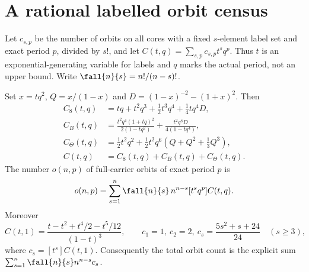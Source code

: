 \section{A rational labelled orbit census}
Let $c_{s,p}$ be the number of orbits on all cores with a fixed $s$-element
label set and exact period $p$, divided by $s!$, and let
$C(t,q)=\sum_{s,p}c_{s,p}t^sq^p$. Thus $t$ is an exponential-generating
variable for labels and $q$ marks the actual period, not an upper bound.
Write $\fall{n}{s}=n!/(n-s)!$.

\begin{theorem}\label{thm:census}
Set $x=tq^2$, $Q=x/(1-x)$ and $D=(1-x)^{-2}-(1+x)^2$. Then
\begin{align}
 C_8(t,q)&=tq+t^2q^3+\tfrac12t^3q^4+\tfrac14tq^4D,\label{eq:c8}\\
 C_B(t,q)&=\frac{t^2q^4(1+tq)^2}{2(1-tq^2)}
          +\frac{t^2q^8D}{4(1-tq^4)},\label{eq:cb}\\
 C_\Theta(t,q)&=\tfrac12t^2q^2+
       \tfrac12t^2q^6\left(Q+Q^2+\tfrac13Q^3\right),\label{eq:ct}\\
 C(t,q)&=C_8(t,q)+C_B(t,q)+C_\Theta(t,q).
\end{align}
The number $o(n,p)$ of full-carrier orbits of exact period $p$ is
\begin{equation}\label{eq:full}
 o(n,p)=\sum_{s=1}^n\fall{n}{s}\,n^{n-s}[t^sq^p]C(t,q).
\end{equation}
Moreover
\begin{equation}\label{eq:cscalar}
 C(t,1)=\frac{t-t^2+t^4/2-t^5/12}{(1-t)^3},\qquad
 c_1=1,\ c_2=2,\ c_s=\frac{5s^2+s+24}{24}\quad(s\ge3),
\end{equation}
where $c_s=[t^s]C(t,1)$. Consequently the total orbit count is the
explicit sum $\sum_{s=1}^n\fall{n}{s}n^{n-s}c_s$.
\end{theorem}

